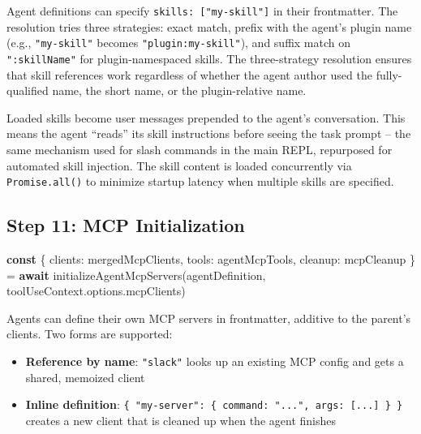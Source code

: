 \documentclass[
  english,
  11pt,
  letterpaper,
]{book}
\newenvironment{Shaded}{\begin{snugshade}}{\end{snugshade}}
\newcommand{\AttributeTok}[1]{\textcolor[rgb]{0.40,0.45,0.13}{#1}}
\newcommand{\ControlFlowTok}[1]{\textcolor[rgb]{0.00,0.23,0.31}{\textbf{#1}}}
\newcommand{\FunctionTok}[1]{\textcolor[rgb]{0.28,0.35,0.67}{#1}}
\newcommand{\KeywordTok}[1]{\textcolor[rgb]{0.00,0.23,0.31}{\textbf{#1}}}
\newcommand{\NormalTok}[1]{\textcolor[rgb]{0.00,0.23,0.31}{#1}}
\newcommand{\OperatorTok}[1]{\textcolor[rgb]{0.37,0.37,0.37}{#1}}
\providecommand{\tightlist}{%
  \setlength{\itemsep}{0pt}\setlength{\parskip}{0pt}}
\begin{document}
Agent definitions can specify \texttt{skills:\ {[}"my-skill"{]}} in
their frontmatter. The resolution tries three strategies: exact match,
prefix with the agent's plugin name (e.g., \texttt{"my-skill"} becomes
\texttt{"plugin:my-skill"}), and suffix match on \texttt{":skillName"}
for plugin-namespaced skills. The three-strategy resolution ensures that
skill references work regardless of whether the agent author used the
fully-qualified name, the short name, or the plugin-relative name.

Loaded skills become user messages prepended to the agent's
conversation. This means the agent ``reads'' its skill instructions
before seeing the task prompt -- the same mechanism used for slash
commands in the main REPL, repurposed for automated skill injection. The
skill content is loaded concurrently via \texttt{Promise.all()} to
minimize startup latency when multiple skills are specified.

\subsection{Step 11: MCP
Initialization}\label{step-11-mcp-initialization}

\begin{Shaded}
\begin{Highlighting}[]
\KeywordTok{const}\NormalTok{ \{ clients}\OperatorTok{:}\NormalTok{ mergedMcpClients}\OperatorTok{,}\NormalTok{ tools}\OperatorTok{:}\NormalTok{ agentMcpTools}\OperatorTok{,}\NormalTok{ cleanup}\OperatorTok{:}\NormalTok{ mcpCleanup \} }\OperatorTok{=}
  \ControlFlowTok{await} \FunctionTok{initializeAgentMcpServers}\NormalTok{(agentDefinition}\OperatorTok{,}\NormalTok{ toolUseContext}\OperatorTok{.}\AttributeTok{options}\OperatorTok{.}\AttributeTok{mcpClients}\NormalTok{)}
\end{Highlighting}
\end{Shaded}

Agents can define their own MCP servers in frontmatter, additive to the
parent's clients. Two forms are supported:

\begin{itemize}
\tightlist
\item
  \textbf{Reference by name}: \texttt{"slack"} looks up an existing MCP
  config and gets a shared, memoized client
\item
  \textbf{Inline definition}:
  \texttt{\{\ "my-server":\ \{\ command:\ "...",\ args:\ {[}...{]}\ \}\ \}}
  creates a new client that is cleaned up when the agent finishes
\end{itemize}
\end{document}
